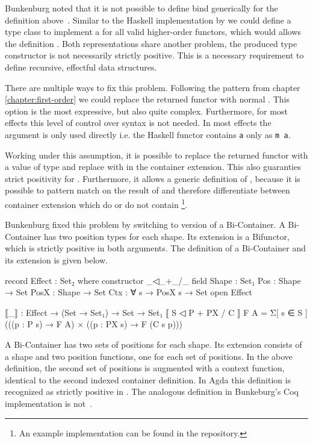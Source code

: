 Bunkenburg noted that it is not possible to define \AgdaFunction{>>=} bind
generically for the definition above~\cite{bunkenburg2019modeling}.
Similar to the Haskell implementation by \textcite{DBLP:conf/haskell/WuSH14} we
could define a type class to implement a  for all valid
higher-order functors, which would allows the definition \AgdaFunction{>>=}.
Both representations share another problem, the produced type constructor is not
necessarily strictly positive.
This is a necessary requirement to define recursive, effectful data structures.

There are multiple ways to fix this problem.
Following the pattern from chapter \ref{chapter:first-order} we could replace
the returned functor with normal .
This option is the most expressive, but also quite complex.
Furthermore, for most effects this level of control over syntax is not needed.
In most effects the argument  is only used directly i.e. the
Haskell functor contains \texttt{a} only as \texttt{m a}.

Working under this assumption, it is possible to replace the returned functor
with a value of type \AgdaSpace{} and
replace  with  in the
container extension.
This also guaranties strict positivity for .
Furthermore, it allows a generic definition of \AgdaFunction{>>=}, because it is
possible to pattern match on the result of  and therefore
differentiate between container extension which do or do not contain
\footnote{An example implementation can be found in the
  repository.}.
 
Bunkenburg fixed this problem by switching to version of a Bi-Container.
A Bi-Container has two position types for each shape.
Its extension is a Bifunctor, which is strictly positive in both arguments.
The definition of a Bi-Container and its extension is given below.

\begin{code}
record Effect : Set₂ where
  constructor _◁_+_/_
  field
    Shape : Set₁
    Pos : Shape → Set
    PosX : Shape → Set
    Ctx : ∀ s → PosX s → Set
open Effect

⟦_⟧ : Effect → (Set → Set₁) → Set → Set₁
⟦ S ◁ P + PX / C ⟧ F A = Σ[ s ∈ S ] (((p : P s) → F A) × ((p : PX s) → F (C s p)))
\end{code}
A Bi-Container has two sets of positions for each shape.
Its extension consists of a shape and two position functions, one for each set
of positions.
In the above definition, the second set of positions is augmented with a context
function, identical to the second indexed container definition.
In Agda this definition is recognized as strictly positive in .
The analogous definition in Bunkeburg's Coq
implementation is not~\cite{bunkenburg2019modeling}.
 
